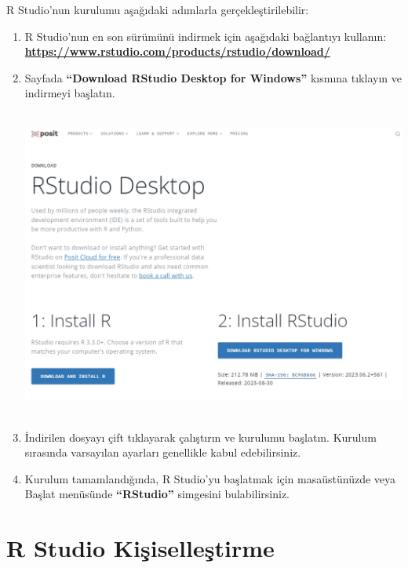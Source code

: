 \documentclass[
  letterpaper,
  DIV=11,
  numbers=noendperiod]{scrreprt}
\begin{document}
R Studio'nun kurulumu aşağıdaki adımlarla gerçekleştirilebilir:

\begin{enumerate}
\def\labelenumi{\arabic{enumi}.}
\item
  R Studio'nun en son sürümünü indirmek için aşağıdaki bağlantıyı
  kullanın:
  \href{https://www.rstudio.com/products/rstudio/download/}{\textbf{https://www.rstudio.com/products/rstudio/download/}}
\item
  Sayfada \textbf{``Download RStudio Desktop for Windows''} kısmına
  tıklayın ve indirmeyi başlatın.

  \includegraphics[width=6.625in,height=4.02083in]{images/R Studio.PNG}
\item
  İndirilen dosyayı çift tıklayarak çalıştırın ve kurulumu başlatın.
  Kurulum sırasında varsayılan ayarları genellikle kabul edebilirsiniz.
\item
  Kurulum tamamlandığında, R Studio'yu başlatmak için masaüstünüzde veya
  Başlat menüsünde \textbf{``RStudio''} simgesini bulabilirsiniz.
\end{enumerate}

\section*{R Studio
Kişiselleştirme}\label{r-studio-kiux15fiselleux15ftirme}

\end{document}
